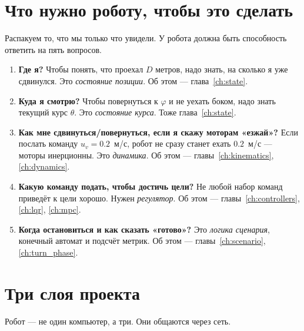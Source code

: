 \section{Что нужно роботу, чтобы это сделать}

Распакуем то, что мы только что увидели. У робота должна быть способность
ответить на пять вопросов.

\begin{enumerate}
  \item[\textbf{(Q1)}] \textbf{Где я?}
        Чтобы понять, что проехал $D$ метров, надо знать, на сколько
        я уже сдвинулся. Это \emph{состояние позиции}.
        Об этом --- глава~\ref{ch:state}.

  \item[\textbf{(Q2)}] \textbf{Куда я смотрю?}
        Чтобы повернуться к $\varphi$ и не уехать боком, надо знать
        текущий курс $\theta$. Это \emph{состояние курса}.
        Тоже глава~\ref{ch:state}.

  \item[\textbf{(Q3)}] \textbf{Как мне сдвинуться/повернуться, если я скажу
        моторам «езжай»?}
        Если послать команду $u_v = 0.2$~м/с, робот не сразу станет ехать
        $0.2$~м/с --- моторы инерционны. Это \emph{динамика}.
        Об этом --- главы~\ref{ch:kinematics}, \ref{ch:dynamics}.

  \item[\textbf{(Q4)}] \textbf{Какую команду подать, чтобы достичь цели?}
        Не любой набор команд приведёт к цели хорошо. Нужен \emph{регулятор}.
        Об этом --- главы~\ref{ch:controllers}, \ref{ch:lqr}, \ref{ch:mpc}.

  \item[\textbf{(Q5)}] \textbf{Когда остановиться и как сказать «готово»?}
        Это \emph{логика сценария}, конечный автомат и подсчёт метрик.
        Об этом --- главы~\ref{ch:scenario}, \ref{ch:turn_phase}.
\end{enumerate}

\section{Три слоя проекта}

Робот --- не один компьютер, а три. Они общаются через сеть.

